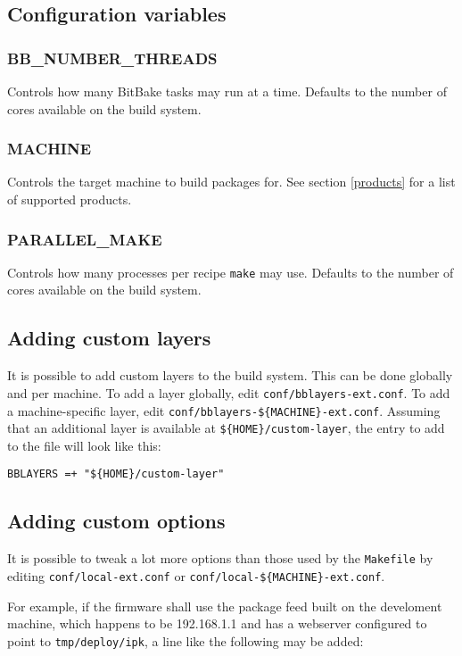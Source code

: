 \documentclass[a4paper]{article}
\newcommand{\shell}[1]{\texttt{\small #1}}
\begin{document}
  \subsection{Configuration variables}
    \subsubsection{BB\_NUMBER\_THREADS}
      Controls how many BitBake tasks may run at a time. Defaults to the
      number of cores available on the build system.

    \subsubsection{MACHINE}
      Controls the target machine to build packages for. See section \ref{products}
      for a list of supported products.

    \subsubsection{PARALLEL\_MAKE}
      Controls how many processes per recipe \shell{make} may use. Defaults to
      the number of cores available on the build system.

  \subsection{Adding custom layers}
  \label{custom_layers}
     It is possible to add custom layers to the build system. This can be done globally
     and per machine. To add a layer globally, edit \shell{conf/bblayers-ext.conf}. To
     add a machine-specific layer, edit \shell{conf/bblayers-\$\{MACHINE\}-ext.conf}.
     Assuming that an additional layer is available at \shell{\$\{HOME\}/custom-layer},
     the entry to add to the file will look like this:

     \shell{BBLAYERS =+ "\$\{HOME\}/custom-layer"}

  \subsection{Adding custom options}
     It is possible to tweak a lot more options than those used by the
     \shell{Makefile} by editing \shell{conf/local-ext.conf} or \shell{conf/local-\$\{MACHINE\}-ext.conf}.

     For example, if the firmware shall use the package feed built on the develoment machine, which
     happens to be 192.168.1.1 and has a webserver configured to point to \shell{tmp/deploy/ipk},
     a line like the following may be added:
\end{document}
